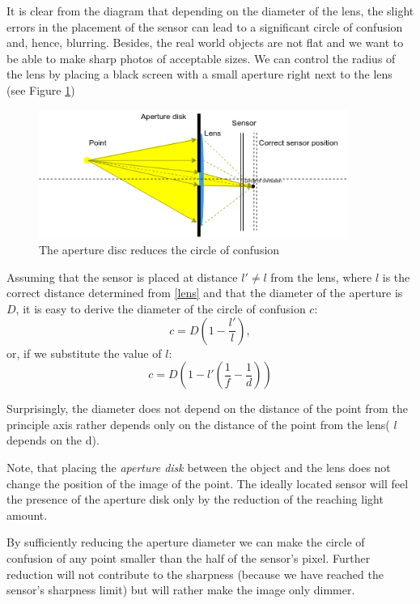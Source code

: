 \documentclass[a4paper,10pt]{article}
\begin{document}
It is clear from the diagram that depending on the diameter of the lens, the slight errors in the placement of the sensor can lead to a significant circle of confusion and, hence, blurring. Besides, the real world objects are not flat and we want to be able to make sharp photos of acceptable  sizes. We can control  the radius of the lens by placing a black screen with a small aperture right next to the lens (see Figure \ref{fig:lens_aperture}) 

\begin{figure}[h]
\centering
 \includegraphics[width=0.9\textwidth]{../../images/lens_confusion_circle_aperture.png}
 \caption{The aperture disc reduces the circle of confusion }
 \label{fig:lens_aperture}
\end{figure}

Assuming that the sensor is placed at distance $l'\neq l$ from the lens, where $l$ is the correct distance determined from \eqref{lens} and that the diameter of the aperture is $D$, it is easy to derive the diameter of the circle of confusion $c$:
\begin{equation}
c = D\left(1-\frac{l'}{l}\right),
\end{equation} 
or, if we substitute the value of $l$:
\begin{equation}
c=D\left(1 -l' \left(\frac{1}{f} - \frac{1}{d}\right )\right )
\label{conf_circ_expanded}
\end{equation} 

Surprisingly,  the diameter does not depend on the distance of the point from the principle axis rather depends only on the distance of the point from the lens( $l$ depends on the d).  

Note, that placing the {\it aperture disk} between the object and the lens does not change the position of the image of the point. The ideally located sensor will feel the presence of the aperture disk only by the reduction of the reaching light amount. 

By sufficiently reducing the aperture diameter we can make the circle of confusion of any point smaller than the half of the sensor's pixel. Further reduction will not contribute to the sharpness (because we have reached the sensor's sharpness limit) but will rather  make the image only dimmer.
\end{document}
